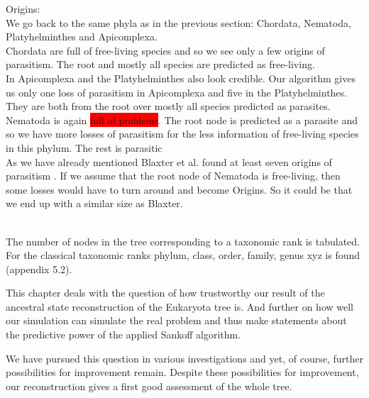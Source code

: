       Origins: \\
      We go back to the same phyla as in the previous section: Chordata, Nematoda, 
        Platyhelminthes and Apicomplexa. \\
      Chordata are full of free-living species and so we see only a few origins of parasitism. The root
      and mostly all species are predicted as free-living. \\
      In Apicomplexa and the Platyhelminthes also look credible. Our algorithm gives us only one loss of
        parasitism in Apicomplexa and five in the Platyhelminthes. They are both from the root over
        mostly all species predicted as parasites. \\
      Nematoda is again \colorbox{red}{full of problems}. The root node is predicted as a parasite and so we have more 
        losses of parasitism for the less information of free-living species in this phylum. The rest 
        is parasitic \\
      As we have already mentioned Blaxter et al. found at least seven origins of parasitism 
        \cite{Blaxter1998}. If we assume that the root node of Nematoda is free-living, then some 
        losses would have to turn around and become Origins. So it could be that we end up with a similar 
        size as Blaxter.

  
  
   \\
  The number of nodes in the tree corresponding to a taxonomic rank is tabulated. \\
  For the classical taxonomic ranks phylum, class, order, family, genus xyz is found (appendix 5.2).

  

  This chapter deals with the question of how trustworthy our result of the ancestral state 
    reconstruction of the Eukaryota tree is. And further on how well our simulation can simulate the 
    real problem and thus make statements about the predictive power of the applied Sankoff algorithm.

  We have pursued this question in various investigations and yet, of course, further possibilities 
    for improvement remain. Despite these possibilities for improvement, our reconstruction gives a 
    first good assessment of the whole tree.

